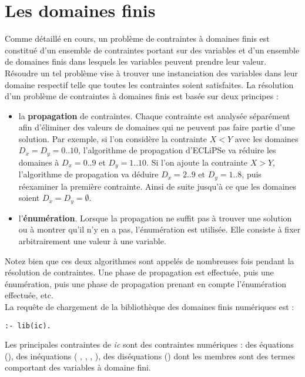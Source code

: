 \section{Les domaines finis}

Comme détaillé en cours, un problème de contraintes à domaines finis
est constitué d'un ensemble de contraintes portant sur des variables
et d'un ensemble de domaines finis dans lesquels les variables peuvent
prendre leur valeur. Résoudre un tel problème vise à trouver une
instanciation des variables dans leur domaine respectif telle que
toutes les contraintes soient satisfaites. La résolution d'un problème
de contraintes à domaines finis est basée sur deux principes :

\begin{itemize}

\item la \textbf{propagation} de contraintes. Chaque contrainte est analysée
      séparément afin d'éliminer des valeurs de domaines qui ne peuvent pas
      faire partie d'une solution. Par exemple, si l'on considère la contrainte
      $X<Y$ avec les domaines $D_x = D_y = 0 .. 10$, l'algorithme de
      propagation d'ECLiPSe va réduire les domaines à $D_x = 0 .. 9$ et $D_y =
      1 .. 10$. Si l'on ajoute la contrainte $X>Y$, l'algorithme de propagation
      va déduire $D_x = 2 .. 9$ et $D_y = 1 .. 8$, puis réexaminer la première
      contrainte. Ainsi de suite jusqu'à ce que les domaines soient $D_x = D_y
      = \emptyset$.

\item l'\textbf{énumération}. Lorsque la propagation ne suffit pas à trouver
      une solution ou à montrer qu'il n'y en a pas, l'énumération est utilisée.
      Elle consiste à fixer arbitrairement une valeur à une variable. 

\end{itemize}

Notez bien que ces deux algorithmes sont appelés de nombreuses fois pendant la
résolution de contraintes. Une phase de propagation est effectuée, puis une
énumération, puis une phase de propagation prenant en compte l'énumération
effectuée, etc.\\

La requête de chargement de la bibliothèque des domaines finis
numériques est :
\begin{verbatim}
:- lib(ic).
\end{verbatim}

Les principales contraintes de \emph{ic} sont des contraintes numériques :
des équations (\code{\#=}), des inéquations (\code{\#<} , \code{\#>},
\code{\#=<}, \code{\#>=}), des diséquations (\code{\#$\backslash$=}) dont les
membres sont des termes comportant des variables à domaine fini.

